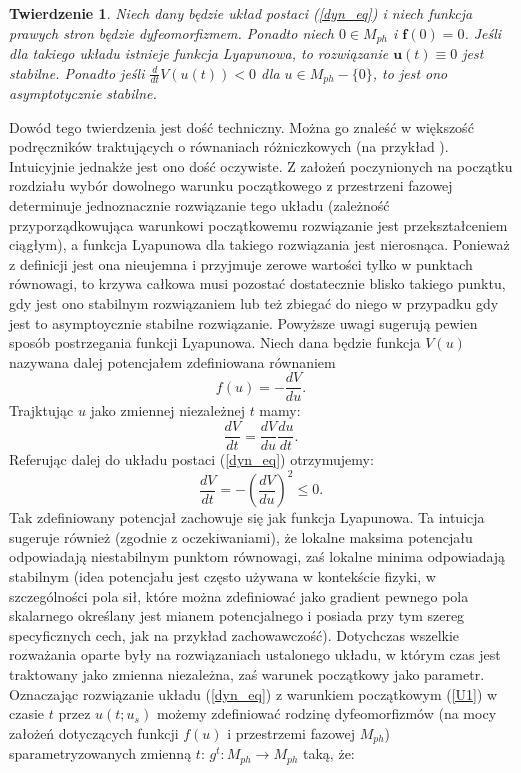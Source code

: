 \documentclass[12pt]{article}
\newtheorem{tw}{Twierdzenie}
\begin{document}
\begin{tw}
	Niech dany będzie układ postaci (\ref{dyn_eq}) i niech funkcja prawych stron będzie dyfeomorfizmem. Ponadto niech $ 0 \in M_{ph} $ i $ \textbf{f}(0) = 0 $. Jeśli dla takiego układu istnieje funkcja Lyapunowa, to rozwiązanie $ \textbf{u}(t) \equiv 0 $ jest stabilne. Ponadto jeśli $ \frac{d}{dt}V(u(t)) < 0 $ dla $ u \in M_{ph} - \{0\} $, to jest ono asymptotycznie stabilne.
\end{tw}
Dowód tego twierdzenia jest dość techniczny. Można go znaleść w większość podręczników traktujących o równaniach różniczkowych (na przykład \cite{Palczewski}). Intuicyjnie jednakże jest ono dość oczywiste. Z założeń poczynionych na początku rozdziału wybór dowolnego warunku początkowego z przestrzeni fazowej determinuje jednoznacznie rozwiązanie tego układu (zależność przyporządkowująca warunkowi początkowemu rozwiązanie jest przekształceniem ciągłym), a funkcja Lyapunowa dla takiego rozwiązania jest nierosnąca. Ponieważ z definicji jest ona nieujemna i przyjmuje zerowe wartości tylko w punktach równowagi, to krzywa całkowa musi pozostać dostatecznie blisko takiego punktu, gdy jest ono stabilnym rozwiązaniem lub też zbiegać do niego w przypadku gdy jest to asymptoycznie stabilne rozwiązanie.\newline
Powyższe uwagi sugerują pewien sposób postrzegania funkcji Lyapunowa. Niech dana będzie funkcja $ V(u) $ nazywana dalej potencjałem zdefiniowana równaniem 
\begin{equation}
f(u) = -\frac{dV}{du}.
\end{equation}
Trajktując $ u $ jako zmiennej niezależnej $ t $ mamy:
\begin{equation}
\frac{dV}{dt} = \frac{dV}{du}\frac{du}{dt}.
\end{equation}
Referując dalej do układu postaci (\ref{dyn_eq}) otrzymujemy:
\begin{equation}
\frac{dV}{dt} = -(\frac{dV}{du})^2 \leq 0.
\end{equation}
Tak zdefiniowany potencjał zachowuje się jak funkcja Lyapunowa. Ta intuicja sugeruje również (zgodnie z oczekiwaniami), że lokalne maksima potencjału odpowiadają niestabilnym punktom równowagi, zaś lokalne minima odpowiadają stabilnym (idea potencjału jest często używana w kontekście fizyki, w szczególności pola sił, które można zdefiniować jako gradient pewnego pola skalarnego określany jest mianem potencjalnego i posiada przy tym szereg specyficznych cech, jak na przykład zachowawczość).\newline
Dotychczas wszelkie rozważania oparte były na rozwiązaniach ustalonego układu, w którym czas jest traktowany jako zmienna niezależna, zaś warunek początkowy jako parametr. Oznaczając rozwiązanie układu (\ref{dyn_eq}) z warunkiem początkowym (\ref{U1}) w czasie $ t $ przez $ u(t;u_{s}) $ możemy zdefiniować rodzinę dyfeomorfizmów (na mocy założeń dotyczących funkcji $ f(u) $ i przestrzemi fazowej $ M_{ph} $) sparametryzowanych zmienną $ t $: $ g^t:M_{ph} \rightarrow M_{ph} $ taką, że: 
\end{document}
